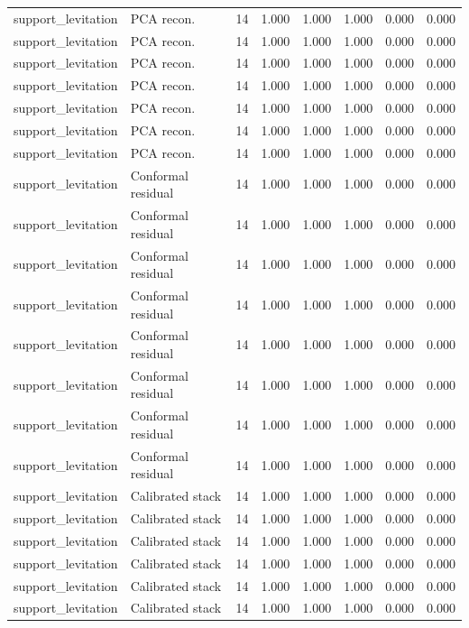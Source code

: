 {\begin{longtable}{llrrrrrr}
support\_levitation & PCA recon. & 14 & 1.000 & 1.000 & 1.000 & 0.000 & 0.000 \\
support\_levitation & PCA recon. & 14 & 1.000 & 1.000 & 1.000 & 0.000 & 0.000 \\
support\_levitation & PCA recon. & 14 & 1.000 & 1.000 & 1.000 & 0.000 & 0.000 \\
support\_levitation & PCA recon. & 14 & 1.000 & 1.000 & 1.000 & 0.000 & 0.000 \\
support\_levitation & PCA recon. & 14 & 1.000 & 1.000 & 1.000 & 0.000 & 0.000 \\
support\_levitation & PCA recon. & 14 & 1.000 & 1.000 & 1.000 & 0.000 & 0.000 \\
support\_levitation & PCA recon. & 14 & 1.000 & 1.000 & 1.000 & 0.000 & 0.000 \\
support\_levitation & Conformal residual & 14 & 1.000 & 1.000 & 1.000 & 0.000 & 0.000 \\
support\_levitation & Conformal residual & 14 & 1.000 & 1.000 & 1.000 & 0.000 & 0.000 \\
support\_levitation & Conformal residual & 14 & 1.000 & 1.000 & 1.000 & 0.000 & 0.000 \\
support\_levitation & Conformal residual & 14 & 1.000 & 1.000 & 1.000 & 0.000 & 0.000 \\
support\_levitation & Conformal residual & 14 & 1.000 & 1.000 & 1.000 & 0.000 & 0.000 \\
support\_levitation & Conformal residual & 14 & 1.000 & 1.000 & 1.000 & 0.000 & 0.000 \\
support\_levitation & Conformal residual & 14 & 1.000 & 1.000 & 1.000 & 0.000 & 0.000 \\
support\_levitation & Conformal residual & 14 & 1.000 & 1.000 & 1.000 & 0.000 & 0.000 \\
support\_levitation & Calibrated stack & 14 & 1.000 & 1.000 & 1.000 & 0.000 & 0.000 \\
support\_levitation & Calibrated stack & 14 & 1.000 & 1.000 & 1.000 & 0.000 & 0.000 \\
support\_levitation & Calibrated stack & 14 & 1.000 & 1.000 & 1.000 & 0.000 & 0.000 \\
support\_levitation & Calibrated stack & 14 & 1.000 & 1.000 & 1.000 & 0.000 & 0.000 \\
support\_levitation & Calibrated stack & 14 & 1.000 & 1.000 & 1.000 & 0.000 & 0.000 \\
support\_levitation & Calibrated stack & 14 & 1.000 & 1.000 & 1.000 & 0.000 & 0.000 \\

\end{longtable}}
